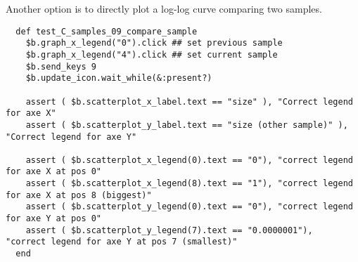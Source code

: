 Another option is to directly plot a log-log curve comparing two samples.

\begin{verbatim}
  def test_C_samples_09_compare_sample
    $b.graph_x_legend("0").click ## set previous sample
    $b.graph_x_legend("4").click ## set current sample
    $b.send_keys 9
    $b.update_icon.wait_while(&:present?)

    assert ( $b.scatterplot_x_label.text == "size" ), "Correct legend for axe X"
    assert ( $b.scatterplot_y_label.text == "size (other sample)" ), "Correct legend for axe Y"

    assert ( $b.scatterplot_x_legend(0).text == "0"), "correct legend for axe X at pos 0"
    assert ( $b.scatterplot_x_legend(8).text == "1"), "correct legend for axe X at pos 8 (biggest)"
    assert ( $b.scatterplot_y_legend(0).text == "0"), "correct legend for axe Y at pos 0"
    assert ( $b.scatterplot_y_legend(7).text == "0.0000001"),   "correct legend for axe Y at pos 7 (smallest)"
  end
\end{verbatim}

